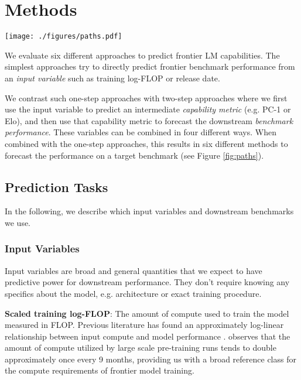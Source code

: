\section{Methods}

\begin{figure*}
    \centering
    \texttt{[image: ./figures/paths.pdf]}
    \vskip -0.1in
    \caption{
     Six approaches for predicting frontier LM capabilities. Two direct methods (blue pathways) model benchmark performance as a sigmoid function of either release date or compute (log-FLOP). Four two-step methods (red and purple pathways) first use a linear function to predict intermediate capability metrics (PC-1 or Chatbot Arena Elo) from input variables, then map these metrics to benchmark scores using a sigmoid function.
    }
    \label{fig:paths}
\end{figure*}

We evaluate six different approaches to predict frontier LM capabilities.
The simplest approaches try to directly predict frontier benchmark performance from an \emph{input variable} such as training log-FLOP or release date. 

We contrast such one-step approaches with two-step approaches where we first use the input variable to predict an intermediate \emph{capability metric} (e.g. PC-1 or Elo), and then use that capability metric to forecast the downstream \emph{benchmark performance}. These variables can be combined in four different ways. When combined with the one-step approaches, this results in six different methods to forecast the performance on a target benchmark (see Figure \ref{fig:paths}).

\subsection{Prediction Tasks}
In the following, we describe which input variables and downstream benchmarks we use.

\subsubsection{Input Variables}

Input variables are broad and general quantities that we expect to have predictive power for downstream performance. They don't require knowing any specifics about the model, e.g. architecture or exact training procedure. 

\textbf{Scaled training log-FLOP}: The amount of compute used to train the model measured in FLOP. Previous literature has found an approximately log-linear relationship between input compute and model performance \citep[e.g.][]{Finnveden_2020, owen2024predictablelanguagemodelbenchmark}. \citet{sevilla2022computetrends} observes that the amount of compute utilized by large scale pre-training runs tends to double approximately once every 9 months, providing us with a broad reference class for the compute requirements of frontier model training.

